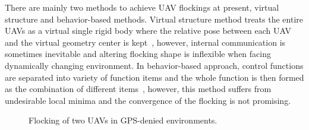 There are mainly two methods to achieve UAV flockings at present, virtual structure and behavior-based methods. Virtual structure method treats the entire UAVs as a virtual single rigid body where the relative pose between each UAV and the virtual geometry center is kept~\cite{Virtual2008,Askari2015,Cai2012,RAS,Distributed,LQR2014,VirtualLeader,Bearing2016}, however, internal communication is sometimes inevitable and altering flocking shape is inflexible when facing dynamically changing environment. In behavior-based approach, control functions are separated into variety of function items and the whole function is then formed as the combination of different items~\cite{Zhang2018,Martin2014,Vicsek2018,VLAP,Behavior2004}, however, this method suffers from undesirable local minima and the convergence of the flocking is not promising.

\begin{figure}[htb]
  \centering
  \caption{Flocking of two UAVs in GPS-denied environments.}\label{fig:indoor_outdoor}
\end{figure}

